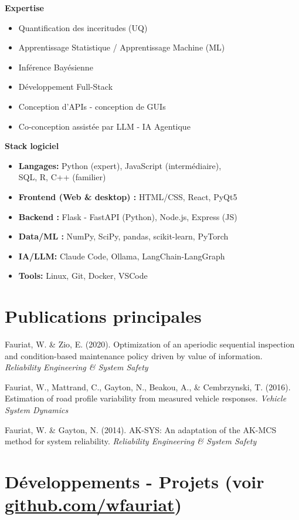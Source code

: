 \documentclass[10pt,a4paper]{article}
\newcommand{\resumeitem}[1]{\item\small{#1}}
\begin{document}
\begin{minipage}[t]{0.48\textwidth}
\textbf{Expertise}
\begin{itemize}

  \resumeitem{Quantification des inceritudes (UQ)}
  \resumeitem{Apprentissage Statistique / Apprentissage Machine (ML)}
  \resumeitem{Inférence Bayésienne}
  \resumeitem{Développement Full-Stack}
  \resumeitem{Conception d'APIs - conception de GUIs}
  \resumeitem{Co-conception assistée par LLM - IA Agentique}
\end{itemize}
\end{minipage}%
\hfill
\begin{minipage}[t]{0.48\textwidth}
\textbf{Stack logiciel}
\begin{itemize}
  \resumeitem{\textbf{Langages:} Python (expert), JavaScript (intermédiaire), \\ SQL, R, C++ (familier)}
  \resumeitem{\textbf{Frontend (Web \& desktop) :} HTML/CSS, React, PyQt5}
  \resumeitem{\textbf{Backend :} Flask - FastAPI (Python), Node.js, Express (JS)}
  \resumeitem{\textbf{Data/ML :} NumPy, SciPy, pandas, scikit-learn, PyTorch}
  \resumeitem{\textbf{IA/LLM:} Claude Code, Ollama, LangChain-LangGraph}
  \resumeitem{\textbf{Tools:} Linux, Git, Docker, VSCode}
\end{itemize}
\end{minipage}

\section*{Publications principales}

\small
Fauriat, W. \& Zio, E. (2020). Optimization of an aperiodic sequential inspection and condition-based maintenance policy driven by value of information. \textit{Reliability Engineering \& System Safety}

Fauriat, W., Mattrand, C., Gayton, N., Beakou, A., \& Cembrzynski, T. (2016). Estimation of road profile variability from measured vehicle responses. \textit{Vehicle System Dynamics}

Fauriat, W. \& Gayton, N. (2014). AK-SYS: An adaptation of the AK-MCS method for system reliability. \textit{Reliability Engineering \& System Safety}

\section*{Développements - Projets (voir \href{https://github.com/wfauriat}{github.com/wfauriat})}
\end{document}
